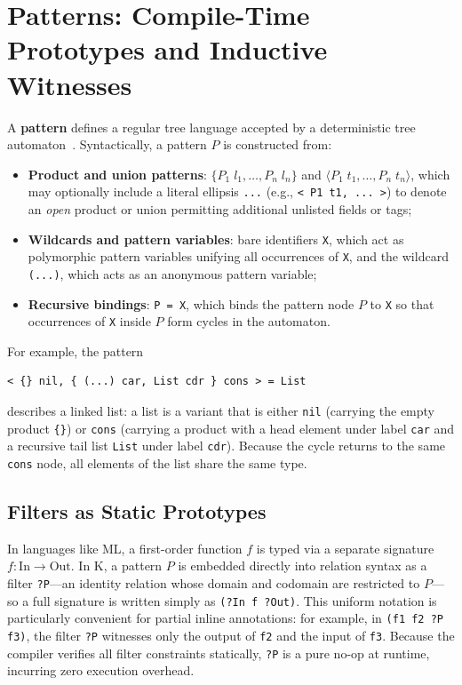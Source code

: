 \documentclass[11pt,a4paper]{article}
\begin{document}
\section{Patterns: Compile-Time Prototypes and Inductive Witnesses}

A \textbf{pattern} defines a regular tree language accepted by a deterministic tree automaton~\cite{hosoya2003regular}. Syntactically, a pattern $P$ is constructed from:
\begin{itemize}
  \item \textbf{Product and union patterns}: $\{ P_1 \; l_1, \dots, P_n \; l_n \}$ and $\langle P_1 \; t_1, \dots, P_n \; t_n \rangle$, which may optionally include a literal ellipsis \lstinline|...| (e.g., \lstinline|< P1 t1, ... >|) to denote an \emph{open} product or union permitting additional unlisted fields or tags;
  \item \textbf{Wildcards and pattern variables}: bare identifiers \lstinline|X|, which act as polymorphic pattern variables unifying all occurrences of \lstinline|X|, and the wildcard \lstinline|(...)|, which acts as an anonymous pattern variable;
  \item \textbf{Recursive bindings}: \lstinline|P = X|, which binds the pattern node $P$ to \lstinline|X| so that occurrences of \lstinline|X| inside $P$ form cycles in the automaton.
\end{itemize}

For example, the pattern
\begin{lstlisting}[language=k]
< {} nil, { (...) car, List cdr } cons > = List
\end{lstlisting}
describes a linked list: a list is a variant that is either \lstinline|nil| (carrying the empty product \lstinline|{}|) or \lstinline|cons| (carrying a product with a head element under label \lstinline|car| and a recursive tail list \lstinline|List| under label \lstinline|cdr|). Because the cycle returns to the same \lstinline|cons| node, all elements of the list share the same type.

\subsection{Filters as Static Prototypes}

In languages like ML, a first-order function $f$ is typed via a separate signature $f : \text{In} \to \text{Out}$. In K, a pattern $P$ is embedded directly into relation syntax as a filter \lstinline|?P|---an identity relation whose domain and codomain are restricted to $P$---so a full signature is written simply as \lstinline|(?In f ?Out)|. This uniform notation is particularly convenient for partial inline annotations: for example, in \lstinline|(f1 f2 ?P f3)|, the filter \lstinline|?P| witnesses only the output of \lstinline|f2| and the input of \lstinline|f3|. Because the compiler verifies all filter constraints statically, \lstinline|?P| is a pure no-op at runtime, incurring zero execution overhead.
\end{document}
